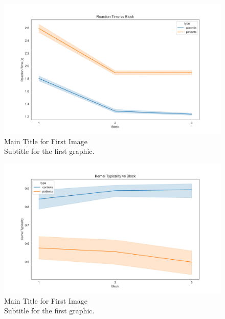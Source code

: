 \begin{figure}[H]
    \centering
     \includegraphics[width=15cm]{MainLayout/Images/chapter5/rt_block.jpg}
    \caption{Main Title for First Image \\ \small Subtitle for the first graphic.}
    \label{fig:rt_block}
\end{figure}

\begin{figure}[H]
    \centering
    \includegraphics[width=15cm]{MainLayout/Images/chapter5/kernel_typicality_block.jpg}
    \caption{Main Title for First Image \\ \small Subtitle for the first graphic.}
    \label{fig:kernel_typicality_block}
\end{figure}

